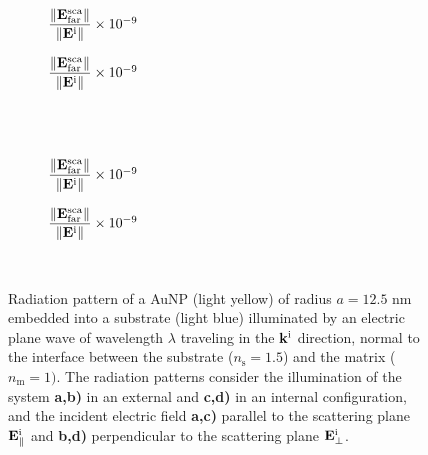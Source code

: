 \begin{figure}[t!]
    \centering
    \def\svgwidth{.8\textwidth}
    \hspace*{-.215\textwidth}%
    \vspace*{-.5em}%
        \begin{subfigure}{.32\textwidth}\caption{\footnotesize$\dfrac{\norm{\vb{E}^\text{sca}_\text{far}}}{\norm{\vb{E}^\text{i}}} \times 10^{-9}$  }\label{sfig:Far:Sup:Norm:a}\end{subfigure}%
        \begin{subfigure}{.4\textwidth}\caption{\footnotesize$\dfrac{\norm{\vb{E}^\text{sca}_\text{far}}}{\norm{\vb{E}^\text{i}}} \times 10^{-9}$  }\label{sfig:Far:Sup:Norm:b}\end{subfigure}\\
    \\
    \def\svgwidth{.8\textwidth}
    \hspace*{-.215\textwidth}%
    \vspace*{-.5em}%
        \begin{subfigure}{.32\textwidth}\caption{\footnotesize$\dfrac{\norm{\vb{E}^\text{sca}_\text{far}}}{\norm{\vb{E}^\text{i}}} \times 10^{-9}$  }\label{sfig:Far:Sup:Norm:c}\end{subfigure}%
        \begin{subfigure}{.4\textwidth}\caption{\footnotesize$\dfrac{\norm{\vb{E}^\text{sca}_\text{far}}}{\norm{\vb{E}^\text{i}}} \times 10^{-9}$  }\label{sfig:Far:Sup:Norm:d}\end{subfigure}\\
    \caption[  Radiation pattern of a AuNP supported into a substrate illuminated at normal incidence ]{Radiation pattern of a AuNP (light yellow) of radius $a = 12.5$ nm embedded into a substrate (light blue) illuminated by an electric plane wave of  wavelength $\lambda$ traveling in the $\vb{k}^\text{i}$ direction, normal to the interface between the substrate ($n_\text{s} = 1.5$) and the matrix ($n_\text{m} = 1)$. The radiation patterns consider the illumination of the system  \textbf{a,b)} in an external and  \textbf{c,d)} in an internal configuration, and the incident electric field \textbf{a,c)} parallel to the scattering plane $\vb{E}^\text{i}_\parallel$ and \textbf{b,d)} perpendicular to the scattering plane $\vb{E}^\text{i}_\perp$.}
    \label{fig:Far:Sup:Norm}
\end{figure}

